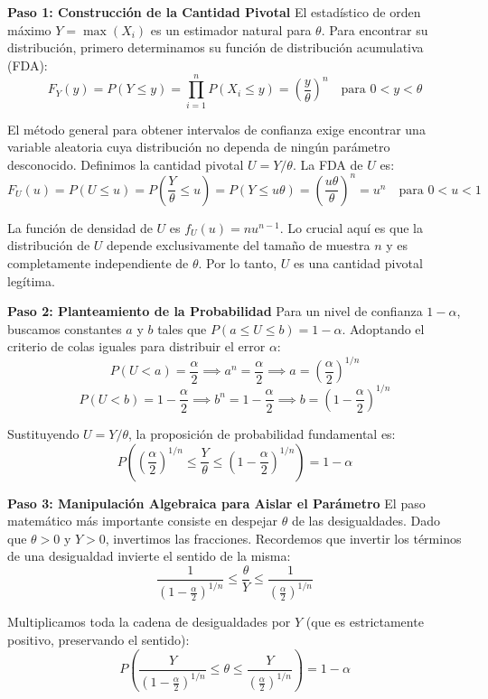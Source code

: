 \textbf{Paso 1: Construcción de la Cantidad Pivotal}
El estadístico de orden máximo $Y = \max(X_i)$ es un estimador natural para $\theta$. Para encontrar su distribución, primero determinamos su función de distribución acumulativa (FDA):
$$ F_Y(y) = P(Y \le y) = \prod_{i=1}^n P(X_i \le y) = \left( \frac{y}{\theta} \right)^n \quad \text{para } 0 < y < \theta $$

El método general para obtener intervalos de confianza exige encontrar una variable aleatoria cuya distribución no dependa de ningún parámetro desconocido. Definimos la cantidad pivotal $U = Y/\theta$. La FDA de $U$ es:
$$ F_U(u) = P(U \le u) = P\left(\frac{Y}{\theta} \le u\right) = P(Y \le u\theta) = \left( \frac{u\theta}{\theta} \right)^n = u^n \quad \text{para } 0 < u < 1 $$

La función de densidad de $U$ es $f_U(u) = n u^{n-1}$. Lo crucial aquí es que la distribución de $U$ depende exclusivamente del tamaño de muestra $n$ y es completamente independiente de $\theta$. Por lo tanto, $U$ es una cantidad pivotal legítima.

\textbf{Paso 2: Planteamiento de la Probabilidad}
Para un nivel de confianza $1 - \alpha$, buscamos constantes $a$ y $b$ tales que $P(a \le U \le b) = 1 - \alpha$. 
Adoptando el criterio de colas iguales para distribuir el error $\alpha$:
$$ P(U < a) = \frac{\alpha}{2} \implies a^n = \frac{\alpha}{2} \implies a = \left(\frac{\alpha}{2}\right)^{1/n} $$
$$ P(U < b) = 1 - \frac{\alpha}{2} \implies b^n = 1 - \frac{\alpha}{2} \implies b = \left(1 - \frac{\alpha}{2}\right)^{1/n} $$

Sustituyendo $U = Y/\theta$, la proposición de probabilidad fundamental es:
$$ P\left( \left(\frac{\alpha}{2}\right)^{1/n} \le \frac{Y}{\theta} \le \left(1 - \frac{\alpha}{2}\right)^{1/n} \right) = 1 - \alpha $$

\textbf{Paso 3: Manipulación Algebraica para Aislar el Parámetro}
El paso matemático más importante consiste en despejar $\theta$ de las desigualdades. Dado que $\theta > 0$ y $Y > 0$, invertimos las fracciones. Recordemos que invertir los términos de una desigualdad invierte el sentido de la misma:
$$ \frac{1}{\left(1 - \frac{\alpha}{2}\right)^{1/n}} \le \frac{\theta}{Y} \le \frac{1}{\left(\frac{\alpha}{2}\right)^{1/n}} $$

Multiplicamos toda la cadena de desigualdades por $Y$ (que es estrictamente positivo, preservando el sentido):
$$ P\left( \frac{Y}{\left(1 - \frac{\alpha}{2}\right)^{1/n}} \le \theta \le \frac{Y}{\left(\frac{\alpha}{2}\right)^{1/n}} \right) = 1 - \alpha $$

